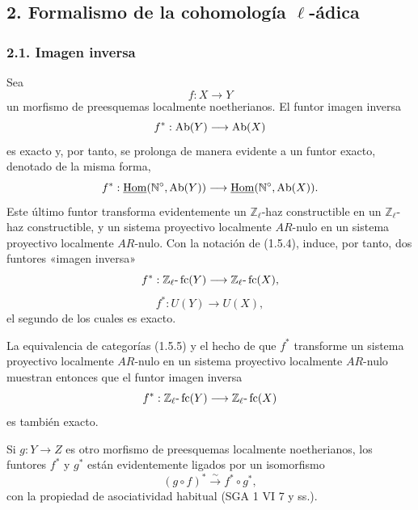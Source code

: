 \subsection*{2. Formalismo de la cohomología \(\ell\)-ádica}

\subsubsection*{2.1. Imagen inversa}

Sea
\[
f:X\longrightarrow Y
\]
un morfismo de preesquemas localmente noetherianos. El funtor imagen inversa
\[
f^*:\operatorname{Ab}(Y)\longrightarrow \operatorname{Ab}(X)
\]
es exacto y, por tanto, se prolonga de manera evidente a un funtor exacto, denotado de la misma forma,
\[
f^*:\underline{\operatorname{Hom}}(\mathbb N^\circ,\operatorname{Ab}(Y))\longrightarrow \underline{\operatorname{Hom}}(\mathbb N^\circ,\operatorname{Ab}(X)).
\]
Este último funtor transforma evidentemente un \(\mathbb Z_\ell\)-haz constructible en un \(\mathbb Z_\ell\)-haz constructible, y un sistema proyectivo localmente \(AR\)-nulo en un sistema proyectivo localmente \(AR\)-nulo. Con la notación de (1.5.4), induce, por tanto, dos funtores «imagen inversa»
\[
f^*:\mathbb Z_\ell\text{-}\operatorname{fc}(Y)\longrightarrow \mathbb Z_\ell\text{-}\operatorname{fc}(X),
\]
\[
f^*:U(Y)\longrightarrow U(X),
\]
el segundo de los cuales es exacto.

La equivalencia de categorías (1.5.5) y el hecho de que \(f^*\) transforme un sistema proyectivo localmente \(AR\)-nulo en un sistema proyectivo localmente \(AR\)-nulo muestran entonces que el funtor imagen inversa
\[
f^*:\mathbb Z_\ell\text{-}\operatorname{fc}(Y)\longrightarrow \mathbb Z_\ell\text{-}\operatorname{fc}(X)
\]
es también exacto.

Si \(g:Y\to Z\) es otro morfismo de preesquemas localmente noetherianos, los funtores \(f^*\) y \(g^*\) están evidentemente ligados por un isomorfismo
\[
(g\circ f)^*\xrightarrow{\sim}f^*\circ g^*,
\]
con la propiedad de asociatividad habitual (SGA 1 VI 7 y ss.).
